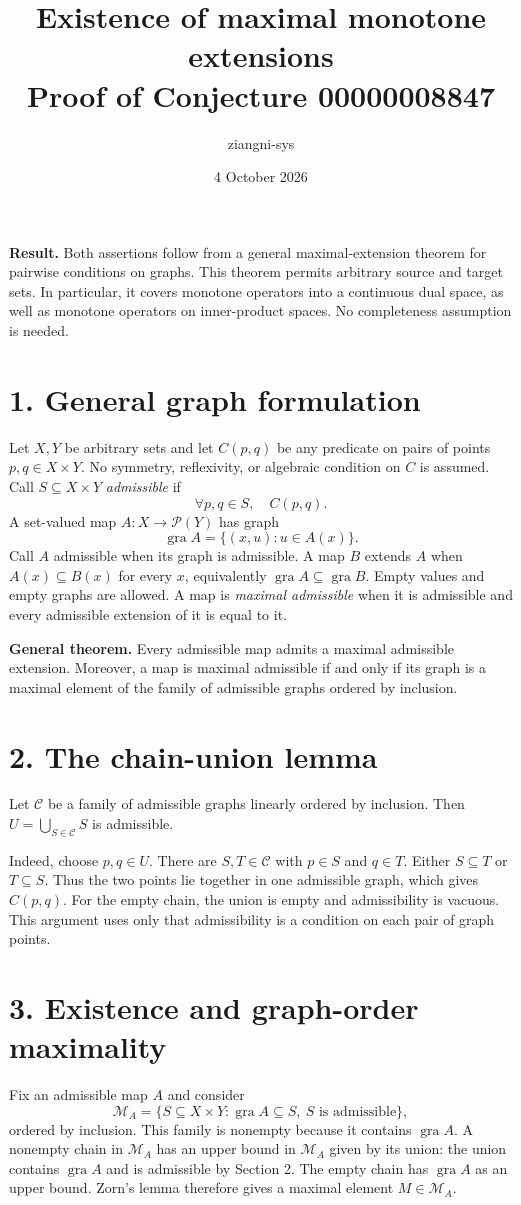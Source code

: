\documentclass[11pt,a4paper]{article}
\title{Existence of maximal monotone extensions\\Proof of Conjecture 00000008847}
\author{ziangni-sys}
\date{4 October 2026}
\newcommand{\gra}{\operatorname{gra}}
\begin{document}
\maketitle

\textbf{Result.} Both assertions follow from a general maximal-extension
theorem for pairwise conditions on graphs. This theorem permits arbitrary
source and target sets. In particular, it covers monotone operators into
a continuous dual space, as well as monotone operators on inner-product
spaces. No completeness assumption is needed.

\section*{1. General graph formulation}
Let $X,Y$ be arbitrary sets and let $C(p,q)$ be any predicate on pairs of
points $p,q\in X\times Y$. No symmetry, reflexivity, or algebraic
condition on $C$ is assumed. Call $S\subseteq X\times Y$ \emph{admissible}
if
\[
  \forall p,q\in S,\quad C(p,q).
\]
A set-valued map $A:X\to\mathcal P(Y)$ has graph
\[
  \gra A=\{(x,u):u\in A(x)\}.
\]
Call $A$ admissible when its graph is admissible. A map $B$ extends $A$
when $A(x)\subseteq B(x)$ for every $x$, equivalently
$\gra A\subseteq\gra B$. Empty values and empty graphs are allowed.
A map is \emph{maximal admissible} when it is admissible and every
admissible extension of it is equal to it.

\textbf{General theorem.} Every admissible map admits a maximal
admissible extension. Moreover, a map is maximal admissible if and only
if its graph is a maximal element of the family of admissible graphs
ordered by inclusion.

\section*{2. The chain-union lemma}
Let $\mathcal C$ be a family of admissible graphs linearly ordered by
inclusion. Then $U=\bigcup_{S\in\mathcal C}S$ is admissible.

Indeed, choose $p,q\in U$. There are $S,T\in\mathcal C$ with $p\in S$
and $q\in T$. Either $S\subseteq T$ or $T\subseteq S$. Thus the two
points lie together in one admissible graph, which gives $C(p,q)$.
For the empty chain, the union is empty and admissibility is vacuous.
This argument uses only that admissibility is a condition on each pair
of graph points.

\newpage
\section*{3. Existence and graph-order maximality}
Fix an admissible map $A$ and consider
\[
  \mathcal M_A=\{S\subseteq X\times Y:\gra A\subseteq S,
                \ S\text{ is admissible}\},
\]
ordered by inclusion. This family is nonempty because it contains
$\gra A$. A nonempty chain in $\mathcal M_A$ has an upper bound in
$\mathcal M_A$ given by its union: the union contains $\gra A$ and is
admissible by Section 2. The empty chain has $\gra A$ as an upper bound.
Zorn's lemma therefore gives a maximal element $M\in\mathcal M_A$.
\end{document}
